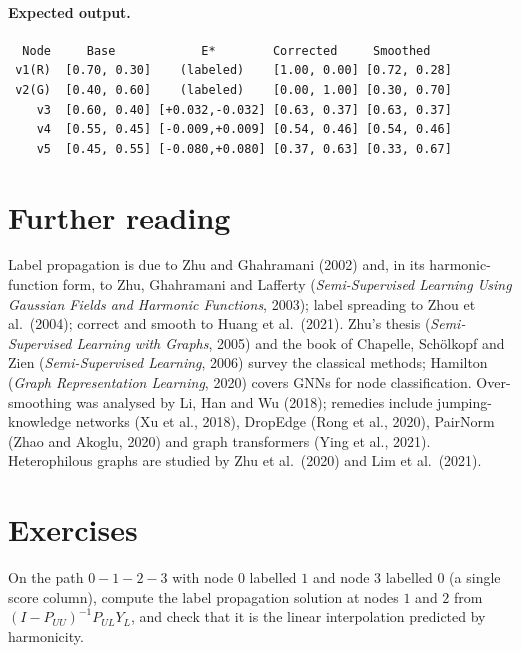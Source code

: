 \begin{notechapter}
\paragraph{Expected output.}
\begin{verbatim}
  Node     Base            E*        Corrected     Smoothed
 v1(R)  [0.70, 0.30]    (labeled)    [1.00, 0.00] [0.72, 0.28]
 v2(G)  [0.40, 0.60]    (labeled)    [0.00, 1.00] [0.30, 0.70]
    v3  [0.60, 0.40] [+0.032,-0.032] [0.63, 0.37] [0.63, 0.37]
    v4  [0.55, 0.45] [-0.009,+0.009] [0.54, 0.46] [0.54, 0.46]
    v5  [0.45, 0.55] [-0.080,+0.080] [0.37, 0.63] [0.33, 0.67]
\end{verbatim}

\section*{Further reading}
Label propagation is due to Zhu and Ghahramani (2002) and, in its harmonic-function form, to Zhu, Ghahramani and Lafferty (\emph{Semi-Supervised Learning Using Gaussian Fields and Harmonic Functions}, 2003); label spreading to Zhou et al.\ (2004); correct and smooth to Huang et al.\ (2021). Zhu's thesis (\emph{Semi-Supervised Learning with Graphs}, 2005) and the book of Chapelle, Schölkopf and Zien (\emph{Semi-Supervised Learning}, 2006) survey the classical methods; Hamilton (\emph{Graph Representation Learning}, 2020) covers GNNs for node classification. Over-smoothing was analysed by Li, Han and Wu (2018); remedies include jumping-knowledge networks (Xu et al., 2018), DropEdge (Rong et al., 2020), PairNorm (Zhao and Akoglu, 2020) and graph transformers (Ying et al., 2021). Heterophilous graphs are studied by Zhu et al.\ (2020) and Lim et al.\ (2021).

\section*{Exercises}

\begin{exercise}\label{semi-supervised-graphs:exr:1}
On the path $0 - 1 - 2 - 3$ with node $0$ labelled $1$ and node $3$ labelled $0$ (a single score column), compute the label propagation solution at nodes $1$ and $2$ from $(I - P_{UU})^{-1}P_{UL}Y_L$, and check that it is the linear interpolation predicted by harmonicity.
\end{exercise}


\end{notechapter}

